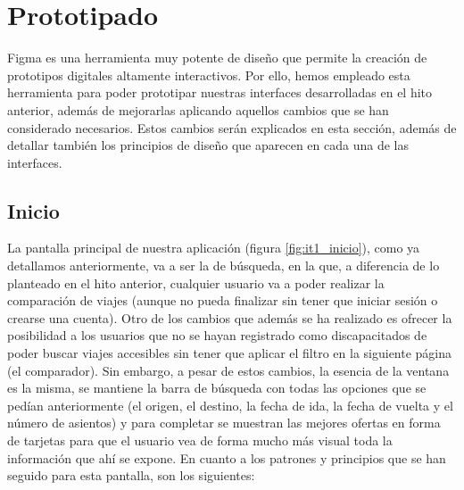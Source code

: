 \section{Prototipado}

Figma es una herramienta muy potente de diseño que permite la creación de prototipos
digitales altamente interactivos. Por ello, hemos empleado esta herramienta para poder
prototipar nuestras interfaces desarrolladas en el hito anterior, además de mejorarlas
aplicando aquellos cambios que se han considerado necesarios. Estos cambios serán explicados
en esta sección, además de detallar también los principios de diseño que aparecen en cada
una de las interfaces.

\subsection*{Inicio}

La pantalla principal de nuestra aplicación (figura \ref{fig:it1_inicio}), como ya detallamos anteriormente, va a ser la de búsqueda,
en la que, a diferencia de lo planteado en el hito anterior, cualquier usuario va a poder realizar la
comparación de viajes (aunque no pueda finalizar sin tener que iniciar sesión o crearse una cuenta). Otro
de los cambios que además se ha realizado es ofrecer la posibilidad a los usuarios que no se hayan registrado
como discapacitados de poder buscar viajes accesibles sin tener que aplicar el filtro en la siguiente página
(el comparador). Sin embargo, a pesar de estos cambios, la esencia de la ventana es la misma, se mantiene la
barra de búsqueda con todas las opciones que se pedían anteriormente (el origen, el destino, la fecha de ida,
la fecha de vuelta y el número de asientos) y para completar se muestran las mejores ofertas en forma de
tarjetas para que el usuario vea de forma mucho más visual toda la información que ahí se expone. En cuanto a
los patrones y principios que se han seguido para esta pantalla, son los siguientes:


